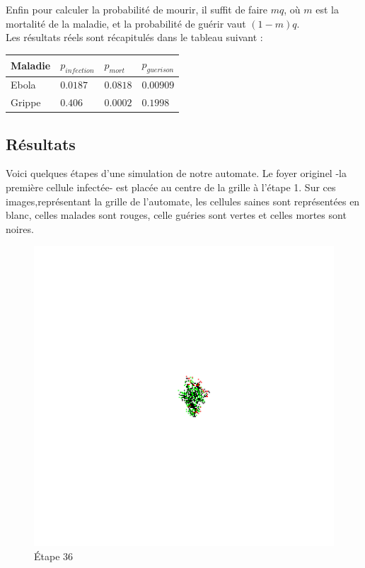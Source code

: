\documentclass{article}
\begin{document}
Enfin pour calculer la probabilité de mourir, il suffit de faire $mq$, où $m$ est la mortalité de la maladie, et la probabilité de guérir vaut $(1-m)q$. \\
Les résultats réels sont récapitulés dans le tableau suivant :

\begin{tabular} {| p{2cm} | p{2cm}| p{2cm} | p{2cm} |}
	\hline
	Maladie & $p_{infection}$ & $p_{mort}$ & $p_{guerison}$ \\ \hline
	Ebola & $0.0187$ & $0.0818$ & $0.00909$ \\ \hline
	Grippe & $0.406$ & $0.0002$ & $0.1998$ \\
	\hline
\end{tabular}

\subsection{Résultats}

Voici quelques étapes d'une simulation de notre automate. Le foyer originel -la première cellule infectée- est placée au centre de la grille à l'étape 1. Sur ces images,représentant la grille de l'automate, les cellules saines sont représentées en blanc, celles malades sont rouges, celle guéries sont vertes et celles mortes sont noires.

\begin{figure}[H]
\centering
\includegraphics[scale=0.22]{../images/Frame-36.png}
\caption{Étape 36}
\end{figure}
\end{document}

